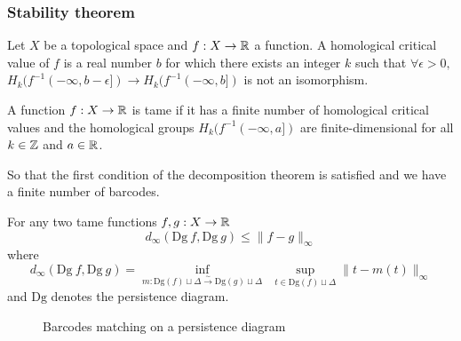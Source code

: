 \subsubsection{Stability theorem}

\newcommand{\Dg}{\mathrm{Dg}}

\begin{definition}
  Let $X$ be a topological space and $f : X \to \mathbb{R}$ a function.
  A homological critical value of $f$ is a real number $b$ for which
  there exists an integer $k$ such that $\forall \epsilon > 0, $
  $H_k(f^{-1}(-\infty, b-\epsilon]) \to H_k(f^{-1}(-\infty, b])$ is not
  an isomorphism.
\end{definition}

\begin{definition}[Tame]
  A function $f : X \to \mathbb{R}$ is tame if it has a finite number of homological
  critical values and the homological groups $H_k(f^{-1}(-\infty, a])$ are finite-dimensional
  for all $k\in\mathbb{Z}$ and $a\in\mathbb{R}$.
\end{definition}
\RM So that the first condition of the decomposition theorem is satisfied
and we have a finite number of barcodes.

\begin{theorem}
  For any two tame functions $f, g : X \to \mathbb{R}$
  $$
  d_\infty(\Dg~f, \Dg~g) \le \|f-g\|_\infty
  $$
  where
  $$
  d_\infty(\Dg~f, \Dg~g) =
  \inf_{m : \Dg(f)\sqcup \Delta \stackrel{\sim}{\to} \Dg(g)\sqcup \Delta}
  ~~
  \sup_{t\in \Dg(f)\sqcup \Delta} \|t-m(t)\|_\infty
  $$
  and $\Dg$ denotes the persistence diagram.
\end{theorem}

\begin{figure}
\centering
{}
\caption{Barcodes matching on a persistence diagram}
\label{fig:persistence diagram domaine}
\end{figure}

